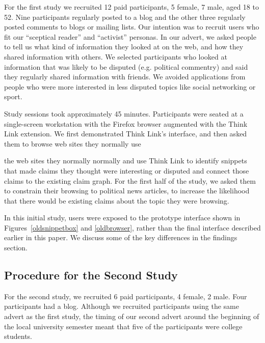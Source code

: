 \documentclass{chi2009}
\newcommand{\todo}[1]{}
\begin{document}
For the first study we recruited 12 paid participants, 5 female, 7 male, aged 18 to 52. Nine participants regularly posted to a blog and the other three regularly posted comments to blogs or mailing lists. Our intention was to recruit users who fit our ``sceptical reader'' and ``activist'' personas. In our advert, we asked people to tell us what kind of information they looked at on the web, and how they shared information with others. We selected participants who looked at information that was likely to be disputed (e.g. political commentry) and said they regularly shared information with friends. We avoided applications from people who were more interested in less disputed topics like social networking or sport.

\todo{Get the correct number of bloggers}

\todo{This was a bad recruiting strategy. We should have recruited people that fitted one of our two personas and then set them tasks that fitted our vision for that persona.}

Study sessions took approximately 45 minutes. Participants were seated at a single-screen workstation with the Firefox browser augmented with the Think Link extension. We first demonstrated Think Link's interface, and then asked them to browse web sites they normally use

the web sites they normally normally and use Think Link to identify snippets that made claims they thought were interesting or disputed and connect those claims to the existing claim graph. For the first half of the study, we asked them to constrain their browsing to political news articles, to increase the likelihood that there would be existing claims about the topic they were browsing.

In this initial study, users were exposed to the prototype interface shown in Figures~\ref{oldsnippetbox} and \ref{oldbrowser}, rather than the final interface described earlier in this paper. We discuss some of the key differences in the findings section.

\subsection{Procedure for the Second Study}

For the second study, we recruited 6 paid participants, 4 female, 2 male. Four participants had a blog. Although we recruited participants using the same advert as the first study, the timing of our second advert around the beginning of the local university semester meant that five of the participants were college students. 
\end{document}
